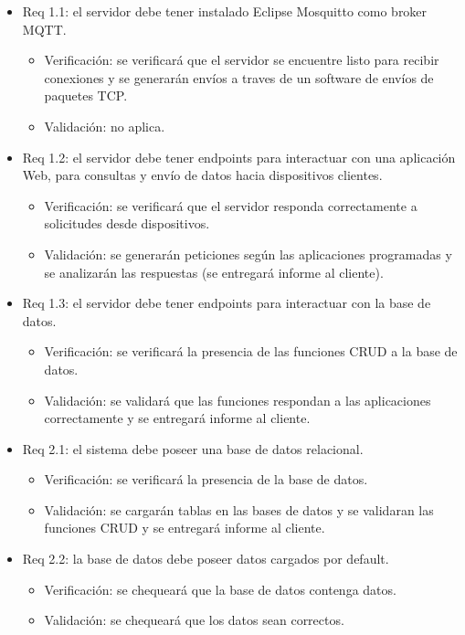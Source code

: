 \documentclass[
11pt, %
]{charter}
\begin{document}
\begin{itemize}

\item Req 1.1: el servidor debe tener instalado Eclipse Mosquitto como broker MQTT.
	\begin{itemize}
	\item Verificación: se verificará que el servidor se encuentre listo para recibir conexiones y se generarán envíos a traves de un software de envíos de paquetes TCP.
	\item Validación: no aplica.
	\end{itemize}


\item Req 1.2: el servidor debe tener endpoints para interactuar con una aplicación Web, para consultas y envío de datos hacia dispositivos clientes.
	\begin{itemize}
	\item Verificación: se verificará que el servidor responda correctamente a solicitudes desde dispositivos.
	\item Validación: se generarán peticiones según las aplicaciones programadas y se analizarán las respuestas (se entregará informe al cliente).
	\end{itemize}

\item Req 1.3: el servidor debe tener endpoints para interactuar con la base de datos.
	\begin{itemize}
	\item Verificación: se verificará la presencia de las funciones CRUD a la base de datos. 
	\item Validación: se validará que las funciones respondan a las aplicaciones correctamente y se entregará informe al cliente.
	\end{itemize}

\item Req 2.1: el sistema debe poseer una base de datos relacional.
	\begin{itemize}
	\item Verificación: se verificará la presencia de la base de datos.  
	\item Validación: se cargarán tablas en las bases de datos y se validaran las funciones CRUD y se entregará informe al cliente.
	\end{itemize}

\item Req 2.2: la base de datos debe poseer datos cargados por default.
	\begin{itemize}
	\item Verificación: se chequeará que la base de datos contenga datos.
	\item Validación: se chequeará que los datos sean correctos.
	\end{itemize}


\end{itemize}
\end{document}
